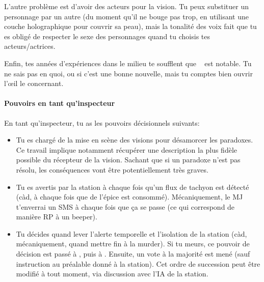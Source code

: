 {	\par L'autre problème est d'avoir des acteurs pour la vision. Tu peux substituer un personnage par un autre (du moment qu'il ne bouge pas trop, en utilisant une couche holographique pour couvrir sa peau), mais la tonalité des voix fait que tu es obligé de respecter le sexe des personnages quand tu choisis tes acteurs/actrices.
	
	\par Enfin, tes années d'expériences dans le milieu te soufflent que \nmPlayerXI ~ est notable. Tu ne sais pas en quoi, ou si c'est une bonne nouvelle, mais tu comptes bien ouvrir l'œil le concernant.
	
	\paragraph{Pouvoirs en tant qu'inspecteur} En tant qu'inspecteur, tu as les pouvoirs décisionnels suivants:
	\begin{itemize}
		\item Tu es chargé de la mise en scène des visions pour désamorcer les paradoxes. Ce travail implique notamment récupérer une description la plus fidèle possible du récepteur de la vision. Sachant que si un paradoxe n'est pas résolu, les conséquences vont être potentiellement très graves.
		
		\item Tu es avertis par la station à chaque fois qu'un flux de tachyon est détecté (càd, à chaque fois que de l'épice est consommé). Mécaniquement, le MJ t'enverrai un SMS à chaque fois que ça se passe (ce qui correspond de manière RP à un beeper).
		
		\item Tu décides quand lever l'alerte temporelle et l'isolation de la station (càd, mécaniquement, quand mettre fin à la murder). Si tu meurs, ce pouvoir de décision est passé à \nmPlayerXII, puis à \nmPlayerVIII. Ensuite, un vote à la majorité est mené (sauf instruction au préalable donné à la station). Cet ordre de succession peut être modifié à tout moment, via discussion avec l'IA de la station.
	\end{itemize}
}




